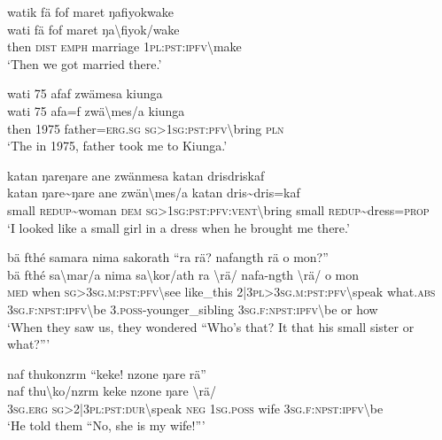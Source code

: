 \ea\label{ex:14:a3184}
watik fä fof maret ŋafiyokwake\\
\gll wati	fä	fof	maret	ŋa{\textbackslash}fiyok/wake\\
     then	\textsc{dist}	\textsc{emph}	marriage	1\textsc{pl}:\textsc{pst}:\textsc{ipfv}{\textbackslash}make\\
\glt `Then we got married there.'
\z

\ea\label{ex:14:a3186}
wati 75 afaf zwämesa kiunga\\
\gll wati	75	afa=f	zwä{\textbackslash}mes/a	kiunga\\
     then	1975	father=\textsc{erg}.\textsc{sg}	\textsc{sg}>1\textsc{sg}:\textsc{pst}:\textsc{pfv}{\textbackslash}bring	\textsc{pln}\\
\glt `The in 1975, father took me to Kiunga.'
\z

\ea\label{ex:14:a3189}
katan ŋareŋare ane zwänmesa katan drisdriskaf\\
\gll katan	ŋare{\textasciitilde}ŋare	ane	zwän{\textbackslash}mes/a	katan	dris{\textasciitilde}dris=kaf\\
     small	\textsc{redup}{\textasciitilde}woman	\textsc{dem}	\textsc{sg}>1\textsc{sg}:\textsc{pst}:\textsc{pfv}:\textsc{vent}{\textbackslash}bring	small	\textsc{redup}{\textasciitilde}dress=\textsc{prop}\\
\glt `I looked like a small girl in a dress when he brought me there.'
\z

\ea\label{ex:14:a3191}
bä fthé samara nima sakorath ``ra rä? nafangth rä o mon?''\\
\gll bä	fthé	sa{\textbackslash}mar/a	nima	sa{\textbackslash}kor/ath	ra	{\textbackslash}rä/	nafa-ngth	{\textbackslash}rä/	o	mon\\
     \textsc{med}	when	\textsc{sg}>3\textsc{sg}.\textsc{m}:\textsc{pst}:\textsc{pfv}{\textbackslash}see	like\_this	2|3\textsc{pl}>3\textsc{sg}.\textsc{m}:\textsc{pst}:\textsc{pfv}{\textbackslash}speak	what.\textsc{abs}	3\textsc{sg}.\textsc{f}:\textsc{npst}:\textsc{ipfv}{\textbackslash}be	3.\textsc{poss}-younger\_sibling	3\textsc{sg}.\textsc{f}:\textsc{npst}:\textsc{ipfv}{\textbackslash}be	or	how\\
\glt `When they saw us, they wondered ``Who's that? It that his small sister or what?'''
\z

\ea\label{ex:14:a3197}
naf thukonzrm ``keke! nzone ŋare rä''\\
\gll naf	thu{\textbackslash}ko/nzrm	keke	nzone	ŋare	{\textbackslash}rä/\\
     3\textsc{sg}.\textsc{erg}	\textsc{sg}>2|3\textsc{pl}:\textsc{pst}:\textsc{dur}{\textbackslash}speak	\textsc{neg}	1\textsc{sg}.\textsc{poss}	wife	3\textsc{sg}.\textsc{f}:\textsc{npst}:\textsc{ipfv}{\textbackslash}be\\
\glt `He told them ``No, she is my wife!'''
\z


